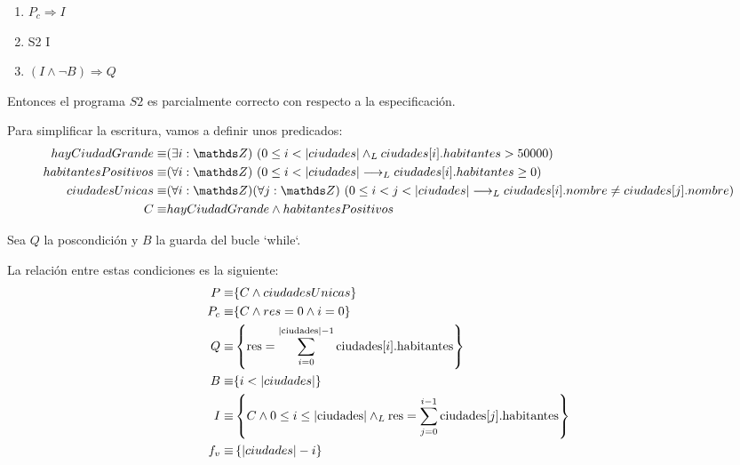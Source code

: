 \documentclass[10pt,a4paper]{article}
\begin{document}
\begin{enumerate}
	\item $P_c \Longrightarrow I$
	\item {} {S2} {I}
	\item $(I \wedge  \neg B) \Longrightarrow Q$
\end{enumerate}

Entonces el programa $S2$ es parcialmente correcto con respecto a la especificación.
\bigskip

Para simplificar la escritura, vamos a definir unos predicados:
%
\begin{align*}
	hayCiudadGrande \equiv     & \existe[unalinea]{i}{\ent}{0 \leq i < |ciudades| \yLuego ciudades[i].habitantes > 50000}                                          \\
	habitantesPositivos \equiv & \paraTodo[unalinea]{i}{\ent}{0 \leq i < |ciudades| \implicaLuego ciudades[i].habitantes \geq 0}                                   \\
	ciudadesUnicas \equiv      & (\forall i: \ent)\paraTodo[unalinea]{j}{\ent}{0 \leq i < j < |ciudades| \implicaLuego ciudades[i].nombre \neq ciudades[j].nombre} \\
	C \equiv                   & hayCiudadGrande \land habitantesPositivos
\end{align*}

Sea \( Q\) la poscondición y \( B \) la guarda del bucle `while`.

La relación entre estas condiciones es la siguiente:
%
\begin{align*}
	P \equiv   & \{C \land ciudadesUnicas \}                                                                                                         \\
	P_c \equiv & \{C \land res = 0 \land i = 0\}                                                                                                     \\
	Q   \equiv & \left\{\text{res} = \sum_{i=0}^{|\text{ciudades}|-1} \text{ciudades}[i].\text{habitantes} \right\}                                  \\
	B   \equiv & \{ i < |ciudades| \}                                                                                                                \\
	I   \equiv & \left\{ C \land 0 \leq i \leq |\text{ciudades}| \land _L \text{res} = \sum_{j=0}^{i-1} \text{ciudades}[j].\text{habitantes} \right\} \\
	f_v \equiv & \left\{ |ciudades| - i \right\}
\end{align*}
\end{document}
